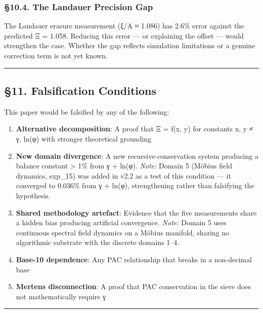 \documentclass[
  11pt,
  a4paper]{article}
\providecommand{\tightlist}{%
  \setlength{\itemsep}{0pt}\setlength{\parskip}{0pt}}
\begin{document}
\subsubsection{§10.4. The Landauer Precision
Gap}\label{the-landauer-precision-gap}

The Landauer erasure measurement (ξ/A ≈ 1.086) has 2.6\% error against
the predicted Ξ = 1.058. Reducing this error --- or explaining the
offset --- would strengthen the case. Whether the gap reflects
simulation limitations or a genuine correction term is not yet known.

\begin{center}\rule{0.5\linewidth}{0.5pt}\end{center}

\subsection{§11. Falsification
Conditions}\label{falsification-conditions}

This paper would be falsified by any of the following:

\begin{enumerate}
\def\labelenumi{\arabic{enumi}.}
\tightlist
\item
  \textbf{Alternative decomposition}: A proof that Ξ = f(x, y) for
  constants x, y ≠ γ, ln(φ) with stronger theoretical grounding
\item
  \textbf{New domain divergence}: A new recursive-conservation system
  producing a balance constant \textgreater{} 1\% from γ + ln(φ).
  \emph{Note:} Domain 5 (Möbius field dynamics, exp\_15) was added in
  v2.2 as a test of this condition --- it converged to 0.036\% from γ +
  ln(φ), strengthening rather than falsifying the hypothesis.
\item
  \textbf{Shared methodology artefact}: Evidence that the five
  measurements share a hidden bias producing artificial convergence.
  \emph{Note:} Domain 5 uses continuous spectral field dynamics on a
  Möbius manifold, sharing no algorithmic substrate with the discrete
  domains 1--4.
\item
  \textbf{Base-10 dependence}: Any PAC relationship that breaks in a
  non-decimal base
\item
  \textbf{Mertens disconnection}: A proof that PAC conservation in the
  sieve does not mathematically require γ
\end{enumerate}

\begin{center}\rule{0.5\linewidth}{0.5pt}\end{center}
\end{document}
